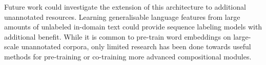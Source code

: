 \documentclass[11pt,a4paper]{article}
\begin{document}
Future work could investigate the extension of this architecture to additional unannotated resources. Learning generalisable language features from large amounts of unlabeled in-domain text could provide sequence labeling models with additional benefit.
While it is common to pre-train word embeddings on large-scale unannotated corpora, only limited research has been done towards useful methods for pre-training or co-training more advanced compositional modules.












\end{document}
